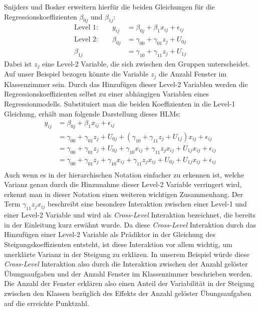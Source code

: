 \documentclass[12pt, a4paper]{article}\usepackage[]{graphicx}\usepackage[]{color}
\begin{document}
Snijders und Bosker \citeyearpar{SnijdersTomA.B2012Ma:a} erweitern hierfür die beiden Gleichungen für die Regressionskoeffizienten $\beta_{0j}$ und $\beta_{1j}$:
\begin{equation} \label{eq:variance}
\begin{split}	
 \text{Level 1:}  \qquad y_{ij} & = \beta_{0j} + \beta_{1}x_{ij} + \epsilon_{ij}\\
 \text{Level 2:} \qquad \beta_{0j} & = \gamma_{00} + \gamma_{01}z_{j} + U_{0j}\\
 \beta_{1j} & = \gamma_{10} + \gamma_{11}z_{j} + U_{1j}
\end{split}	
\end{equation}
Dabei ist $z_{j}$ eine Level-2 Variable, die sich zwischen den Gruppen unterscheidet. Auf unser Beispiel bezogen könnte die Variable $z_{j}$ die Anzahl Fenster im Klassenzimmer sein. Durch das Hinzufügen dieser Level-2 Variablen werden die Regressionskoeffizienten selbst zu einer abhängigen Variablen eines Regressionmodells. Substituiert man die beiden Koeffizienten in die Level-1 Gleichung, erhält man folgende Darstellung dieses HLMs:
\begin{equation} \label{eq:flat_variance}
\begin{split}	
y_{ij} & = \beta_{0j} + \beta_{1}x_{ij} + \epsilon_{ij}\\
& = \gamma_{00} + \gamma_{01}z_{j} + U_{0j} + (\gamma_{10} + \gamma_{11}z_{j} + U_{1j})x_{ij} + \epsilon_{ij}\\
& = \gamma_{00} + \gamma_{01}z_{j} + U_{0j} + \gamma_{10}x_{ij} + \gamma_{11}z_{j}x_{ij} + U_{1j}x_{ij} + \epsilon_{ij}\\
& = \gamma_{00} + \gamma_{01}z_{j} + \gamma_{10}x_{ij} + \gamma_{11}z_{j}x_{ij} + U_{0j} + U_{1j}x_{ij} + \epsilon_{ij}\\
\end{split}	
\end{equation} 
Auch wenn es in der hierarchischen Notation einfacher zu erkennen ist, welche Varianz genau durch die Hinzunahme dieser Level-2 Variable verringert wird, erkennt man in dieser Notation einen weiteren wichtigen Zusammenhang. Der Term $\gamma_{11}z_{j}x_{ij}$ beschreibt eine besondere Interaktion zwischen einer Level-1 und einer Level-2 Variable und wird als \textit{Cross-Level} Interaktion bezeichnet, die bereits in der Einleitung kurz erwähnt wurde. Da diese \textit{Cross-Level} Interaktion durch das Hinzufügen einer Level-2 Variable als Prädiktor in der Gleichung des Steigungskoeffizienten entsteht, ist diese Interaktion vor allem wichtig, um unerklärte Varianz in der Steigung zu erklären. In unserem Beispiel würde diese \textit{Cross-Level} Interaktion also durch die Interaktion zwischen der Anzahl gelöster Übungsaufgaben und der Anzahl Fenster im Klassenzimmer beschrieben werden. Die Anzahl der Fenster erklären also einen Anteil der Variabilität in der Steigung zwischen den Klassen bezüglich des Effekts der Anzahl gelöster Übungsaufgaben auf die erreichte Punktzahl.
\end{document}
